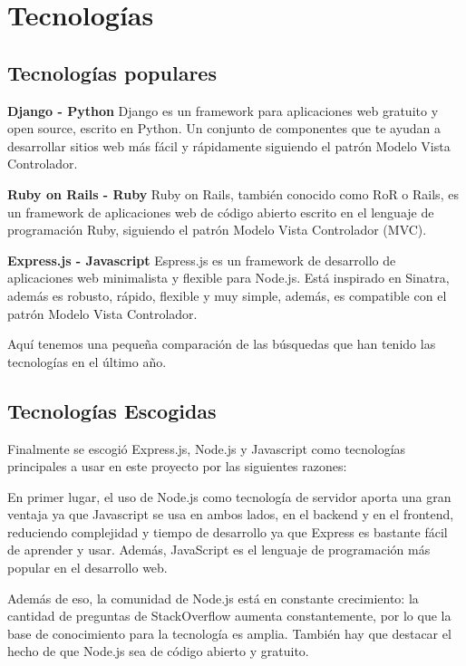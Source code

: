 
\section{Tecnologías}
\label{3:sec1}

\subsection{Tecnologías populares}
\label{3:1:1}
{\bf Django - Python}
Django es un framework para aplicaciones web gratuito y open source, escrito en Python. Un conjunto de componentes que te ayudan a desarrollar sitios web más fácil y rápidamente siguiendo el patrón Modelo Vista Controlador.

{\bf Ruby on Rails - Ruby}
Ruby on Rails, también conocido como RoR o Rails, es un framework de aplicaciones web de código abierto escrito en el lenguaje de programación Ruby, siguiendo el patrón Modelo Vista Controlador (MVC).

{\bf Express.js - Javascript}
Espress.js  es un framework de desarrollo de aplicaciones web minimalista y flexible para Node.js. Está inspirado en Sinatra, además es robusto, rápido, flexible y muy simple, además, es compatible con el patrón Modelo Vista Controlador.

Aquí tenemos una pequeña comparación de las búsquedas que han tenido las tecnologías en el último año.

\subsection{Tecnologías Escogidas}
\label{3:1:2}

Finalmente se escogió Express.js, Node.js y Javascript como tecnologías principales a usar en este proyecto por las siguientes razones:

En primer lugar, el uso de Node.js como tecnología de servidor aporta una gran ventaja ya que Javascript se usa en ambos lados, en el backend y en el frontend, reduciendo complejidad y tiempo de desarrollo ya que Express es bastante fácil de aprender y usar. Además, JavaScript es el lenguaje de programación más popular en el desarrollo web.

Además de eso, la comunidad de Node.js está en constante crecimiento: la cantidad de preguntas de StackOverflow aumenta constantemente, por lo que la base de conocimiento para la tecnología es amplia. También hay que destacar el hecho de que Node.js sea de código abierto y gratuito. 

